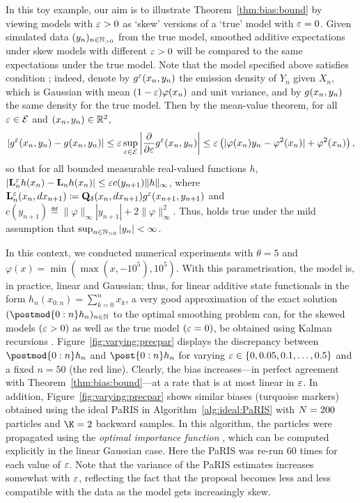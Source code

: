 In this toy example, our aim is to illustrate Theorem~\ref{thm:bias:bound} by viewing models with $\varepsilon > 0$ as `skew' versions of a `true' model with $\varepsilon = 0$. Given simulated data $(y_n)_{n \in \mathbb{N}_{> 0}}$ from the true model, smoothed additive expectations under skew models with different $\varepsilon > 0$ will be compared to the same expectations under the true model. Note that the model specified above satisfies condition ; indeed, denote by $g_{}^\varepsilon(x_n, y_n)$ the emission density of $Y_n$ given $X_n$, which is Gaussian with mean $(1 - \varepsilon) \varphi(x_n)$ and unit variance, and by $g_{}(x_n, y_n)$ the same density for the true model. Then by the mean-value theorem, for all $\varepsilon \in \mathcal{E}$ and $(x_n, y_n) \in \mathbb{R}^2$, 
$$
\left\vert g_{}^\varepsilon(x_n, y_n) - g_{}(x_n, y_n) \right \vert \leq \varepsilon \sup_{\varepsilon \in \mathcal{E}} \left \vert\frac{\partial}{\partial \varepsilon} g_{}^\varepsilon(x_n, y_n) \right\vert 
\leq \varepsilon \left( \vert \varphi(x_n) y_n - \varphi^2(x_n) \vert + \varphi^2(x_n) \right), 
$$
so that for all bounded measurable real-valued functions $h$,  $\vert \mathbf{L}_{n}^\varepsilon h(x_n) - \mathbf{L}_{n} h(x_n) \vert \leq \varepsilon c(y_{n + 1}) \| h\|_\infty$, where $\mathbf{L}_{n}^\varepsilon(x_n, d x_{n + 1}) \coloneqq \mathbf{Q}_\delta(x_n, d x_{n + 1}) g_{}^\varepsilon(x_{n + 1}, y_{n + 1})$ and $c(y_{n + 1}) \eqdef \| \varphi \|_\infty |y_{n + 1}| + 2 \| \varphi \|_\infty^2$. Thus,  holds true under the mild assumption that $\sup_{n \in \mathbb{N}_{> 0}} |y_n| < \infty$. 

In this context, we conducted numerical experiments with $\theta = 5$ and $\varphi(x) = \min(\max(x, -10^5), 10^5)$. With this parametrisation, the model is, in practice, linear and Gaussian; thus, for linear additive state functionals in the form $h_n(x_{0:n}) = \sum_{k = 0}^n x_k$, a very good approximation of the exact solution $(\postmod{0:n} h_n)_{n \in \nset}$ to the optimal smoothing problem can, for the skewed models $(\varepsilon > 0)$ as well as the true model $(\varepsilon = 0)$, be obtained using Kalman recursions \cite{rauch1965maximum}. Figure~\ref{fig:varying:precpar} displays the discrepancy between $\postmod{0:n} h_n$ and $\post{0:n} h_n$ for varying $\varepsilon \in \{0, 0.05, 0.1, \ldots, 0.5 \}$ and a fixed $n = 50$ (the red line). Clearly, the bias increases---in perfect agreement with Theorem~\ref{thm:bias:bound}---at a rate that is at most linear in $\varepsilon$. In addition, Figure~\ref{fig:varying:precpar} shows similar biases (turquoise markers) obtained using the ideal PaRIS in Algorithm~\ref{alg:ideal:PaRIS} with $N = 200$ particles and $\K = 2$ backward samples. In this algorithm, the particles were propagated using the \textit{optimal importance function} \cite{doucet2000sequential}, which can be computed explicitly in the linear Gaussian case. Here the PaRIS was re-run $60$ times for each value of $\varepsilon$. Note that the variance of the PaRIS estimates increases somewhat with $\varepsilon$, reflecting the fact that the proposal becomes less and less compatible with the data as the model gets increasingly skew. 

